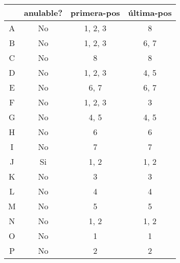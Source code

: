 \documentclass[11pt,a4paper]{report}
\begin{document}
\begin{tabular} {| c | c | c | c |}\hline
 & anulable? & primera-pos & última-pos\\ \hline
A & No & 1, 2, 3 & 8\\ \hline
B & No & 1, 2, 3 & 6, 7\\ \hline
C & No & 8 & 8\\ \hline
D & No & 1, 2, 3 & 4, 5\\ \hline
E & No & 6, 7 & 6, 7\\ \hline
F & No & 1, 2, 3 & 3\\ \hline
G & No & 4, 5 & 4, 5\\ \hline
H & No & 6 & 6\\ \hline
I & No & 7 & 7\\ \hline
J & Si & 1, 2 & 1, 2\\ \hline
K & No & 3 & 3\\ \hline
L & No & 4 & 4\\ \hline
M & No & 5 & 5\\ \hline
N & No & 1, 2 & 1, 2\\ \hline
O & No & 1 & 1\\ \hline
P & No & 2 & 2\\ \hline
\end{tabular}
\end{document}
